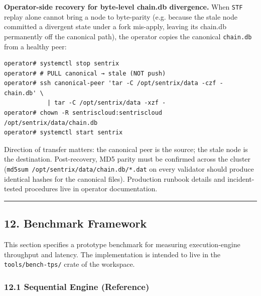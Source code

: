 \documentclass[11pt,a4paper]{article}
\begin{document}
\textbf{Operator-side recovery for byte-level chain.db divergence.} When
\texttt{STF} replay alone cannot bring a node to byte-parity (e.g.
because the stale node committed a divergent state under a fork
mis-apply, leaving its chain.db permanently off the canonical path), the
operator copies the canonical \texttt{chain.db} from a healthy peer:

\begin{verbatim}
operator# systemctl stop sentrix
operator# # PULL canonical → stale (NOT push)
operator# ssh canonical-peer 'tar -C /opt/sentrix/data -czf - chain.db' \
            | tar -C /opt/sentrix/data -xzf -
operator# chown -R sentriscloud:sentriscloud /opt/sentrix/data/chain.db
operator# systemctl start sentrix
\end{verbatim}

Direction of transfer matters: the canonical peer is the source; the
stale node is the destination. Post-recovery, MD5 parity must be
confirmed across the cluster
(\texttt{md5sum\ /opt/sentrix/data/chain.db/*.dat} on every validator
should produce identical hashes for the canonical files). Production
runbook details and incident-tested procedures live in operator
documentation.

\begin{center}\rule{0.5\linewidth}{0.5pt}\end{center}

\hypertarget{12-benchmark-framework}{%
\subsection{12. Benchmark Framework}\label{12-benchmark-framework}}

This section specifies a prototype benchmark for measuring
execution-engine throughput and latency. The implementation is intended
to live in the \texttt{tools/bench-tps/} crate of the workspace.

\hypertarget{121-sequential-engine-reference}{%
\subsubsection{12.1 Sequential Engine
(Reference)}\label{121-sequential-engine-reference}}
\end{document}
